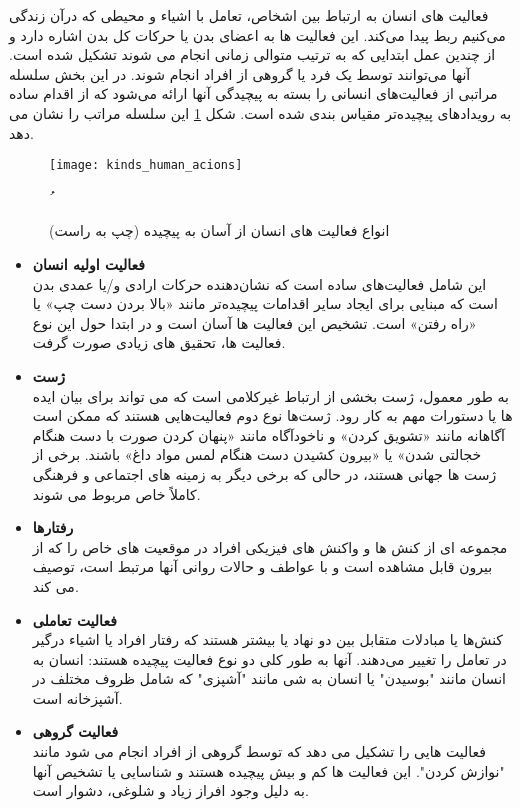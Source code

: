 فعالیت های انسان به ارتباط بین اشخاص، تعامل با اشیاء و محیطی که درآن زندگی می‌کنیم ربط پیدا می‌کند. این فعالیت ها به اعضای بدن یا حرکات کل بدن اشاره دارد و از چندین عمل ابتدایی که به ترتیب متوالی زمانی انجام می شوند تشکیل شده است. آنها می‌توانند توسط یک فرد یا گروهی از افراد انجام شوند. در این بخش سلسله مراتبی از فعالیت‌های انسانی را بسته به پیچیدگی آنها ارائه می‌شود که از اقدام ساده به رویدادهای پیچیده‌تر مقیاس بندی شده است. شکل
\ref{fig:kinds_human_acions}
این سلسله مراتب را نشان می دهد.

\vspace{8pt}
\begin{figure}[ht]
	\centerline{\texttt{[image: kinds\_human\_acions]}}
	\caption{انواع فعالیت های انسان از آسان به پیچیده (چپ به راست)
		\cite{HumanActionReviewMogadame}
	}ُ
	\label{fig:kinds_human_acions}
\end{figure}
\begin{itemize}
	\item \textbf{فعالیت اولیه انسان}\\
این شامل فعالیت‌های ساده است که نشان‌دهنده حرکات ارادی و/یا عمدی بدن است که مبنایی برای ایجاد سایر اقدامات پیچیده‌تر مانند «بالا بردن دست چپ» یا «راه رفتن» است. تشخیص این فعالیت ها آسان است و در ابتدا حول این نوع فعالیت ها،‌ تحقیق های زیادی صورت گرفت.
	
	\item \textbf{ژست}\\
 به طور معمول، ژست بخشی از ارتباط غیرکلامی است که می تواند برای بیان ایده ها یا دستورات مهم به کار رود. ژست‌ها نوع دوم فعالیت‌هایی هستند که ممکن است آگاهانه مانند «تشویق کردن» و ناخودآگاه مانند «پنهان کردن صورت با دست هنگام خجالتی شدن» یا «بیرون کشیدن دست هنگام لمس مواد داغ» باشند. برخی از ژست ها جهانی هستند، در حالی که برخی دیگر به زمینه های اجتماعی و فرهنگی کاملاً خاص مربوط می شوند. 
 
 \vspace{10pt}
	\item \textbf{رفتارها}\\
 مجموعه ای از کنش ها و واکنش های فیزیکی افراد در موقعیت های خاص را که از بیرون قابل مشاهده است و با عواطف و حالات روانی آنها مرتبط است، توصیف می کند.

	\item \textbf{فعالیت تعاملی}\\
کنش‌ها یا مبادلات متقابل بین دو نهاد یا بیشتر هستند که رفتار افراد یا اشیاء درگیر در تعامل را تغییر می‌دهند. آنها به طور کلی دو نوع فعالیت پیچیده هستند: انسان به انسان مانند "بوسیدن" یا انسان به شی مانند "آشپزی" که شامل ظروف مختلف در آشپزخانه است.

	\item \textbf{فعالیت گروهی}\\
 فعالیت هایی را تشکیل می دهد که توسط گروهی از افراد انجام می شود مانند "نوازش کردن". این فعالیت ها کم و بیش پیچیده هستند و شناسایی یا تشخیص آنها به دلیل وجود افراز زیاد و شلوغی، دشوار است. 

\end{itemize}

